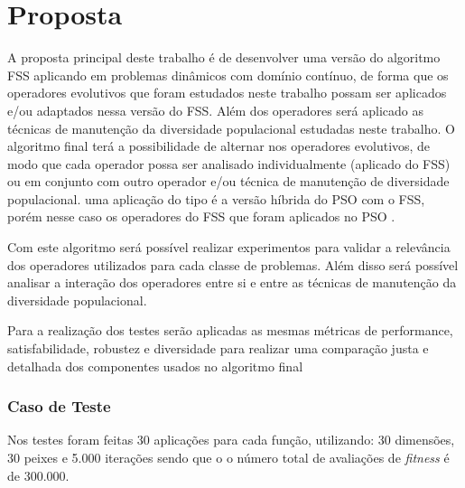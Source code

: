 \chapter{Proposta}
\label{ch:proposta}

A proposta principal deste trabalho é de desenvolver uma versão do algoritmo FSS aplicando em problemas dinâmicos com domínio contínuo, de forma que os operadores evolutivos que foram estudados neste trabalho possam ser aplicados e/ou adaptados nessa versão do FSS. Além dos operadores será aplicado as técnicas de manutenção da diversidade populacional estudadas neste trabalho. O algoritmo final terá a possibilidade de alternar nos operadores evolutivos, de modo que cada operador possa ser analisado individualmente (aplicado do FSS) ou em conjunto com outro operador e/ou técnica de manutenção de diversidade populacional. uma aplicação do tipo é a versão híbrida do PSO com o FSS, porém nesse caso os operadores do FSS que foram aplicados no PSO \cite{cavalcanti2011hybrid}.

Com este algoritmo será possível realizar experimentos para validar a relevância dos operadores utilizados para cada classe de problemas. Além disso será possível analisar a interação dos operadores entre si e entre as técnicas de manutenção da diversidade populacional.

Para a realização dos testes serão aplicadas as mesmas métricas de performance, satisfabilidade, robustez e diversidade para realizar uma comparação justa e detalhada dos componentes usados no algoritmo final

\subsection{Caso de Teste}
\label{sec:test_case}

Nos testes foram feitas 30 aplicações para cada função, utilizando: 30 dimensões, 30 peixes e 5.000 iterações sendo que o o número total de avaliações de \textit{fitness} é de 300.000.

